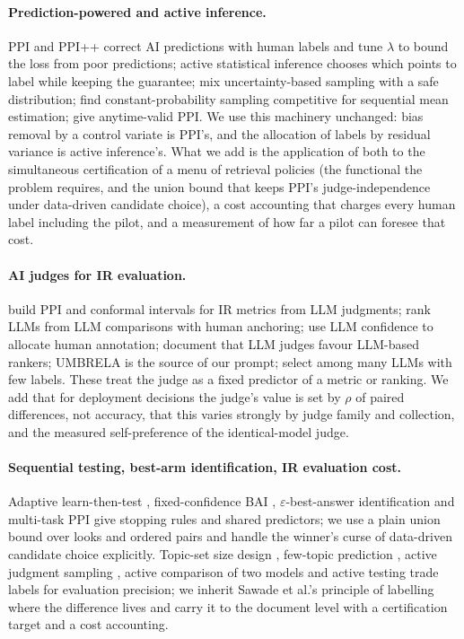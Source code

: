 \documentclass{article}
\newcommand{\eps}{\varepsilon}
\begin{document}
\paragraph{Prediction-powered and active inference.} PPI \citep{angelopoulos2023ppi} and PPI++ \citep{angelopoulos2023ppipp} correct AI predictions with human labels and tune $\lambda$ to bound the loss from poor predictions; active statistical inference \citep{zrnic2024active} chooses which points to label while keeping the guarantee; \citet{li2025robust} mix uncertainty-based sampling with a safe distribution; \citet{sfyraki2026revisiting} find constant-probability sampling competitive for sequential mean estimation; \citet{kilian2025anytime} give anytime-valid PPI. We use this machinery unchanged: bias removal by a control variate is PPI's, and the allocation of labels by residual variance is active inference's. What we add is the application of both to the simultaneous certification of a menu of retrieval policies (the functional the problem requires, and the union bound that keeps PPI's judge-independence under data-driven candidate choice), a cost accounting that charges every human label including the pilot, and a measurement of how far a pilot can foresee that cost.
\paragraph{AI judges for IR evaluation.} \citet{oosterhuis2024reliable} build PPI and conformal intervals for IR metrics from LLM judgments; \citet{chatzi2024ppr} rank LLMs from LLM comparisons with human anchoring; \citet{gligoric2024unconfident} use LLM confidence to allocate human annotation; \citet{balog2025rankers} document that LLM judges favour LLM-based rankers; UMBRELA \citep{upadhyay2024umbrela} is the source of our prompt; \citet{durmazkeser2026selection} select among many LLMs with few labels. These treat the judge as a fixed predictor of a metric or ranking. We add that for deployment decisions the judge's value is set by $\rho$ of paired differences, not accuracy, that this varies strongly by judge family and collection, and the measured self-preference of the identical-model judge.
\paragraph{Sequential testing, best-arm identification, IR evaluation cost.} Adaptive learn-then-test \citep{zecchin2024altt}, fixed-confidence BAI \citep{jamieson2014best,kaufmann2016complexity}, $\eps$-best-answer identification \citep{jourdan2022choosing} and multi-task PPI \citep{emmenegger2026multitask} give stopping rules and shared predictors; we use a plain union bound over looks and ordered pairs and handle the winner's curse of data-driven candidate choice explicitly. Topic-set size design \citep{sakai2016topic}, few-topic prediction \citep{guiver2009few}, active judgment sampling \citep{li2017active}, active comparison of two models \citep{sawade2012active} and active testing \citep{kossen2021active} trade labels for evaluation precision; we inherit Sawade et al.'s principle of labelling where the difference lives and carry it to the document level with a certification target and a cost accounting.
\end{document}
